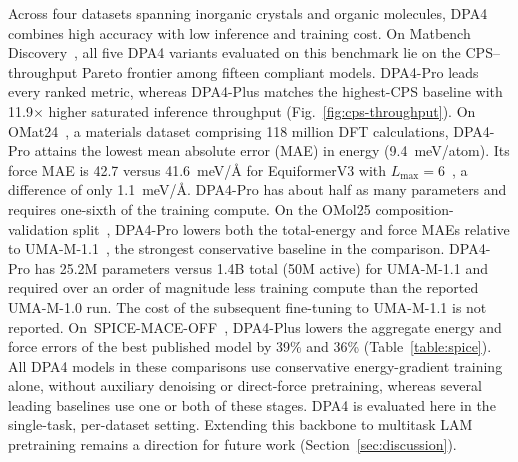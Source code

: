 Across four datasets spanning inorganic crystals and organic molecules, DPA4 combines high accuracy with low inference and training cost.
On Matbench Discovery~\cite{riebesell2025matbench}, all five DPA4 variants evaluated on this benchmark lie on the CPS--throughput Pareto frontier among fifteen compliant models.
DPA4-Pro leads every ranked metric, whereas DPA4-Plus matches the highest-CPS baseline with 11.9$\times$ higher saturated inference throughput (Fig.~\ref{fig:cps-throughput}).
On OMat24~\cite{barroso2024open}, a materials dataset comprising 118 million DFT calculations, DPA4-Pro attains the lowest mean absolute error (MAE) in energy (9.4~meV/atom).
Its force MAE is 42.7 versus 41.6~meV/\AA{} for EquiformerV3 with $L_{\max}=6$~\cite{liao2026equiformerv3}, a difference of only 1.1~meV/\AA{}.
DPA4-Pro has about half as many parameters and requires one-sixth of the training compute.
On the OMol25 composition-validation split~\cite{levine2025open}, DPA4-Pro lowers both the total-energy and force MAEs relative to UMA-M-1.1~\cite{wood2025umafamilyuniversalmodels}, the strongest conservative baseline in the comparison.
DPA4-Pro has 25.2M parameters versus 1.4B total (50M active) for UMA-M-1.1 and required over an order of magnitude less training compute than the reported UMA-M-1.0 run.
The cost of the subsequent fine-tuning to UMA-M-1.1 is not reported.
On~SPICE-MACE-OFF~\cite{kovacs2023mace}, DPA4-Plus lowers the aggregate energy and force errors of the best published model by 39\% and 36\% (Table~\ref{table:spice}).
All DPA4 models in these comparisons use conservative energy-gradient training alone, without auxiliary denoising or direct-force pretraining, whereas several leading baselines use one or both of these stages.
DPA4 is evaluated here in the single-task, per-dataset setting.
Extending this backbone to multitask LAM pretraining remains a direction for future work (Section~\ref{sec:discussion}).

